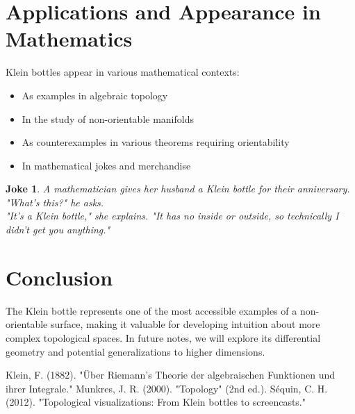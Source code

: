 \documentclass{article}
\newtheorem{joke}{Joke}
\begin{document}
\section{Applications and Appearance in Mathematics}

Klein bottles appear in various mathematical contexts:

\begin{itemize}
    \item As examples in algebraic topology
    \item In the study of non-orientable manifolds
    \item As counterexamples in various theorems requiring orientability
    \item In mathematical jokes and merchandise
\end{itemize}

\begin{joke}
    A mathematician gives her husband a Klein bottle for their anniversary.\\
    "What's this?" he asks.\\
    "It's a Klein bottle," she explains. "It has no inside or outside, so technically I didn't get you anything."
\end{joke}

\section{Conclusion}

The Klein bottle represents one of the most accessible examples of a non-orientable surface, making it valuable for developing intuition about more complex topological spaces. In future notes, we will explore its differential geometry and potential generalizations to higher dimensions.

\begin{thebibliography}{9}
     Klein, F. (1882). "Über Riemann's Theorie der algebraischen Funktionen und ihrer Integrale."
     Munkres, J. R. (2000). "Topology" (2nd ed.).
     Séquin, C. H. (2012). "Topological visualizations: From Klein bottles to screencasts."
\end{thebibliography}
\end{document}

